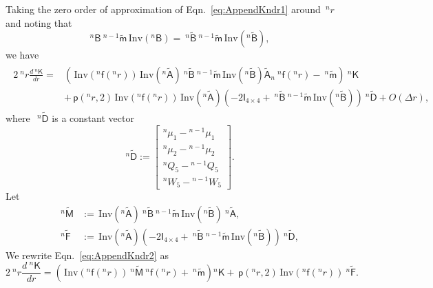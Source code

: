 \documentclass[preprint,10pt,times]{elsarticle}
\numberwithin{equation}{section}
\renewcommand{\u}[1]{\boldsymbol{#1}}
\newcommand{\usf}[1]{\u{\mathsf #1}}
\newcommand{\pr}[1]{\left( #1 \right)}
\newcommand{\p}{\,\mathsf{p}}
\newcommand{\Inv}{\,\mathrm{Inv}}
\renewcommand{\>}{$\Rightarrow$}
\begin{document}
Taking the zero order of approximation of Eqn.~\eqref{eq:AppendKndr1} around~${}^{n}\!{r}$ and noting that
\begin{equation}
	~^{n}{\usf{B}} ~^{n-1}\tilde{\usf{m}} \Inv\pr{{}^{n}\usf{B}} = ~^{n}\tilde{\usf{B}} ~^{n-1}\tilde{\usf{m}} \Inv\pr{{}^{n}\tilde{\usf{B}}},
\end{equation}
we have
\begin{equation}
\begin{aligned}
	\begin{split}
	2 ~^{n}\!{r} \frac{d ~^{n}{\usf{K}}}{dr} = & \left( \Inv\pr{{}^{n}\usf{f}({}^{n}\!r)} \Inv\pr{{}^{n}\tilde{\usf{A}}} ~^{n}\tilde{\usf{B}} ~^{n-1}\tilde{\usf{m}} \Inv\pr{{}^{n}\tilde{\usf{B}}} \tilde{\usf{A}}_n ~^{n}\usf{f}({}^{n}\!r) - ~^{n}\tilde{\usf{m}} \right) ~^{n}{\usf{K}} \\
	& + \p\pr{{}^{n}\!{r},2} \Inv\pr{{}^{n}\usf{f}({}^{n}\!r)} \Inv\pr{{}^{n}\tilde{\usf{A}}} \left( -2\usf{I}_{4\times 4} + ~^{n}\tilde{\usf{B}} ~^{n-1}\tilde{\usf{m}} \Inv\pr{{}^{n}\tilde{\usf{B}}} \right) ~^{n}\tilde{\usf{D}} + O(\Delta r),
	\end{split}
\end{aligned}
\label{eq:AppendKndr2}
\end{equation}
where~$~^{n}\tilde{\usf{D}}$ is a constant vector
\begin{equation}
	~^{n}\tilde{\usf{D}}
	:=
	\begin{bmatrix}
		{}^{n}\!{\mu_{1}}-{}^{n-1}\!{\mu_{1}} \\ {}^{n}\!{\mu_{2}}-{}^{n-1}\!{\mu_{2}}  \\ {}^{n}\!{Q_{5}}-{}^{n-1}\!{Q_{5}} \\ {}^{n}\!{W_{5}}-{}^{n-1}\!{W_{5}}
	\end{bmatrix} .
\end{equation}
Let
\begin{subequations}
	\begin{align}
	~^{n}\tilde{\usf{M}} & := \Inv\pr{{}^{n}\tilde{\usf{A}}} ~^{n}\tilde{\usf{B}} ~^{n-1}\tilde{\usf{m}} \Inv\pr{{}^{n}\tilde{\usf{B}}} ~^{n}\tilde{\usf{A}}, \\
	~^{n}\tilde{\usf{F}} & := \Inv\pr{{}^{n}\tilde{\usf{A}}} \left( -2\usf{I}_{4\times 4} + ~^{n}\tilde{\usf{B}} ~^{n-1}\tilde{\usf{m}} \Inv\pr{{}^{n}\tilde{\usf{B}}} \right) ~^{n}\tilde{\usf{D}},
	\end{align}
\end{subequations}
We rewrite Eqn.~\eqref{eq:AppendKndr2} as
\begin{equation}
	2 ~^{n}\!{r} \frac{d ~^{n}{\usf{K}}}{dr} = \left( \Inv\pr{{}^{n}\usf{f}({}^{n}\!r)} ~^{n}\tilde{\usf{M}} ~^{n}\usf{f}({}^{n}\!r) + ~^{n}\tilde{\usf{m}} \right) {}^{n}{\usf{K}} + \p\pr{{}^{n}\!{r},2} \Inv\pr{{}^{n}\usf{f}({}^{n}\!r)} ~^{n}\tilde{\usf{F}}.
	\label{eq:AppendKndr}
\end{equation}
\end{document}
